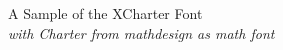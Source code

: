 \documentclass[11pt]{article}
\begin{document}
{\LARGE \noindent A Sample of the XCharter Font}\\

{\large \noindent \textit{with Charter from mathdesign as math font}}\\[5pt]


\end{document}
